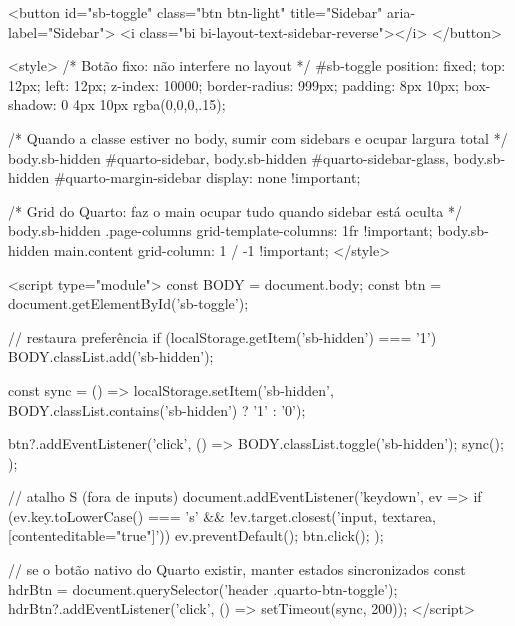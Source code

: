 \documentclass[
  portuguese,
  letterpaper,
  DIV=11,
  numbers=noendperiod]{scrreprt}
\begin{document}
<button id="sb-toggle" class="btn btn-light" title="Sidebar" aria-label="Sidebar">
  <i class="bi bi-layout-text-sidebar-reverse"></i>
</button>

<style>
  /* Botão fixo: não interfere no layout */
  #sb-toggle{
    position: fixed; top: 12px; left: 12px; z-index: 10000;
    border-radius: 999px; padding: 8px 10px; box-shadow: 0 4px 10px rgba(0,0,0,.15);
  }

  /* Quando a classe estiver no body, sumir com sidebars e ocupar largura total */
  body.sb-hidden #quarto-sidebar,
  body.sb-hidden #quarto-sidebar-glass,
  body.sb-hidden #quarto-margin-sidebar { display: none !important; }

  /* Grid do Quarto: faz o main ocupar tudo quando sidebar está oculta */
  body.sb-hidden .page-columns { grid-template-columns: 1fr !important; }
  body.sb-hidden main.content { grid-column: 1 / -1 !important; }
</style>

<script type="module">
  const BODY = document.body;
  const btn  = document.getElementById('sb-toggle');

  // restaura preferência
  if (localStorage.getItem('sb-hidden') === '1') BODY.classList.add('sb-hidden');

  const sync = () => localStorage.setItem('sb-hidden', BODY.classList.contains('sb-hidden') ? '1' : '0');

  btn?.addEventListener('click', () => { BODY.classList.toggle('sb-hidden'); sync(); });

  // atalho S (fora de inputs)
  document.addEventListener('keydown', ev => {
    if (ev.key.toLowerCase() === 's' && !ev.target.closest('input, textarea, [contenteditable="true"]')) {
      ev.preventDefault(); btn.click();
    }
  });

  // se o botão nativo do Quarto existir, manter estados sincronizados
  const hdrBtn = document.querySelector('header .quarto-btn-toggle');
  hdrBtn?.addEventListener('click', () => setTimeout(sync, 200));
</script>
\end{document}

